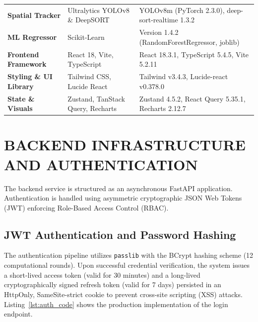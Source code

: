 \documentclass[12pt,a4paper,oneside]{report}
\begin{document}
\begin{table}[htbp]
\begin{tabularx}{\textwidth}{@{}l p{4.2cm} X@{}}
\textbf{Spatial Tracker} & Ultralytics YOLOv8 \& DeepSORT & YOLOv8m (PyTorch 2.3.0), deep-sort-realtime 1.3.2 \\
\textbf{ML Regressor} & Scikit-Learn & Version 1.4.2 (RandomForestRegressor, joblib) \\
\textbf{Frontend Framework} & React 18, Vite, TypeScript & React 18.3.1, TypeScript 5.4.5, Vite 5.2.11 \\
\textbf{Styling \& UI Library} & Tailwind CSS, Lucide React & Tailwind v3.4.3, Lucide-react v0.378.0 \\
\textbf{State \& Visuals} & Zustand, TanStack Query, Recharts & Zustand 4.5.2, React Query 5.35.1, Recharts 2.12.7 \\
\bottomrule
\end{tabularx}
\end{table}

\section{BACKEND INFRASTRUCTURE AND AUTHENTICATION}
The backend service is structured as an asynchronous FastAPI application. Authentication is handled using asymmetric cryptographic JSON Web Tokens (JWT) enforcing Role-Based Access Control (RBAC). 

\subsection{JWT Authentication and Password Hashing}
The authentication pipeline utilizes \texttt{passlib} with the BCrypt hashing scheme (12 computational rounds). Upon successful credential verification, the system issues a short-lived access token (valid for 30 minutes) and a long-lived cryptographically signed refresh token (valid for 7 days) persisted in an HttpOnly, SameSite-strict cookie to prevent cross-site scripting (XSS) attacks. Listing~\ref{lst:auth_code} shows the production implementation of the login endpoint.
\end{document}
